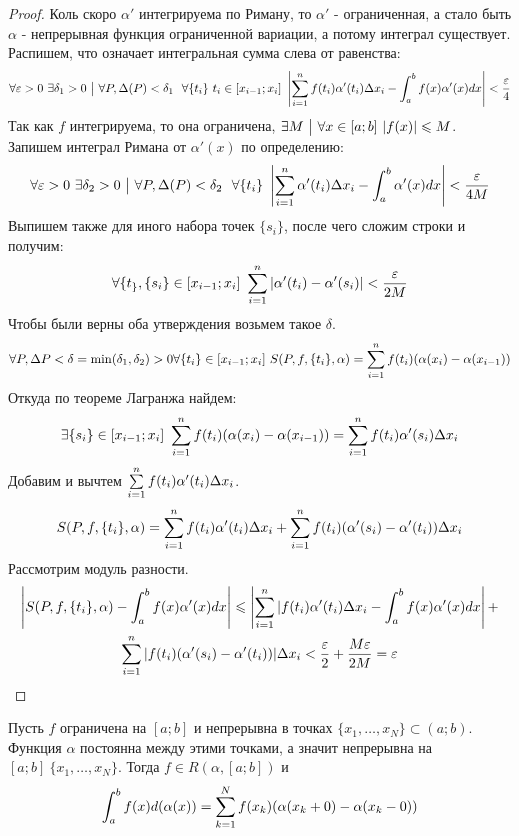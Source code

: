 \begin{proof}
	Коль скоро $\alpha'$ интегрируема по Риману, то $\alpha'$ - ограниченная, а стало быть $\alpha$ - непрерывная функция ограниченной вариации, а потому интеграл существует. Распишем, что означает интегральная сумма слева от равенства:
	\[
		\forall \varepsilon > 0\ \exists \delta_1 > 0 \ \big|\  \forall P, \Delta(P) < \delta_1\ \ \forall \{t_i\}\ t_i \in [x_{i - 1};x_i]\  \left|\sum\limits_{i = 1}^n f(t_i) \alpha'(t_i) \Delta x_i - \int_a^b f(x) \alpha'(x) dx\right| < \frac{\varepsilon}{4}
	\]
	Так как $f$ интегрируема, то она ограничена, $\exists M \ \big|\  \forall x \in [a; b]\ |f(x)| \leqslant M$. Запишем интеграл Римана от $\alpha'(x)$ по определению:
	\[
		\forall \eps > 0\ \exists \delta_2 > 0 \such \forall P, \Delta(P) < \delta_2\ \ \forall \{t_i\}\ \left|\suml_{i = 1}^n \alpha'(t_i)\Delta x_i - \int_a^b \alpha'(x)dx\right| < \frac{\eps}{4M}
	\]
	Выпишем также для иного набора точек $\{s_i\}$, после чего сложим строки и получим:
	\[
		\forall \{t_\}, \{s_i\} \in [x_{i - 1};x_i]\ \sum\limits_{i = 1}^n|\alpha'(t_i) - \alpha'(s_i)| < \frac{\varepsilon}{2M}
	\]
	Чтобы были верны оба утверждения возьмем такое $\delta$.
	\[
		\forall P, \Delta P < \delta = \min(\delta_1, \delta_2) > 0 \forall \{t_i\} \in [x_{i - 1};x_i]\ S(P, f, \{t_i\}, \alpha) = \suml_{i = 1}^nf(t_i)(\alpha(x_i) - \alpha(x_{i - 1}))
	\]
	Откуда по теореме Лагранжа найдем:
	\[
		\exists \{s_i\} \in [x_{i - 1};x_i] \ \sum\limits_{i = 1}^nf(t_i)(\alpha(x_i) - \alpha(x_{i - 1})) = \sum\limits_{i = 1}^nf(t_i)\alpha'(s_i)\Delta x_i
	\]
	Добавим и вычтем $\sum\limits_{i = 1}^nf(t_i)\alpha'(t_i)\Delta x_i$.
	\[
		S(P, f, \{t_i\}, \alpha) = \sum\limits_{i = 1}^nf(t_i)\alpha'(t_i)\Delta x_i + \sum\limits_{i = 1}^nf(t_i)(\alpha'(s_i) - \alpha'(t_i))\Delta x_i
	\]
	Рассмотрим модуль разности.
	\begin{multline*}
		\left|S(P, f, \{t_i\}, \alpha) - \int_a^bf(x)\alpha'(x)dx \right| \leqslant \left|\sum\limits_{i = 1}^n|f(t_i)\alpha'(t_i)\Delta x_i - \int_a^bf(x)\alpha'(x)dx \right| +
		\\
		\sum\limits_{i = 1}^n|f(t_i)(\alpha'(s_i) - \alpha'(t_i))|\Delta x_i < \frac{\varepsilon}{2} + \frac{M \varepsilon}{2M} = \varepsilon
	\end{multline*}
\end{proof}

\begin{theorem}
	Пусть $f$ ограничена на $[a; b]$ и непрерывна в точках $\{x_1, \ldots, x_N\} \subset (a; b)$. Функция $\alpha$ постоянна между этими точками, а значит непрерывна на $[a; b] \ \{x_1, \ldots, x_N\}$. Тогда $f \in R(\alpha, [a; b])$ и
	\[
		\int_a^b f(x)d(\alpha(x)) = \sum\limits_{k = 1}^N f(x_k) (\alpha(x_k + 0) - \alpha(x_k - 0))
	\]
\end{theorem}

